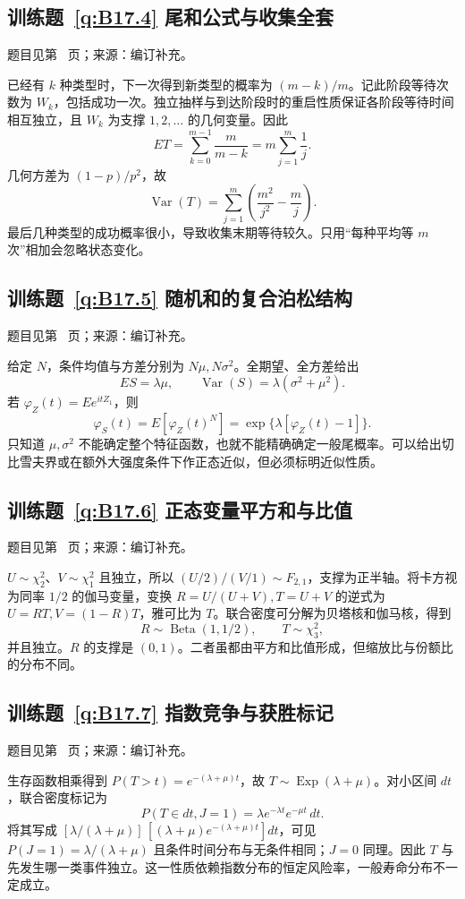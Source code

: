 \documentclass[UTF8,12pt,a4paper,fontset=fandol]{ctexbook}
\begin{document}
\subsection*{训练题~\ref{q:B17.4} 尾和公式与收集全套}\label{a:B17.4}{\small 题目见第~\pageref{q:B17.4} 页；来源：编订补充。}
\begin{solve}已经有 $k$ 种类型时，下一次得到新类型的概率为 $(m-k)/m$。记此阶段等待次数为 $W_k$，包括成功一次。独立抽样与到达阶段时的重启性质保证各阶段等待时间相互独立，且 $W_k$ 为支撑 $1,2,\ldots$ 的几何变量。因此\[ET=\sum_{k=0}^{m-1}\frac{m}{m-k}=m\sum_{j=1}^m\frac1j.\]几何方差为 $(1-p)/p^2$，故\[\operatorname{Var}(T)=\sum_{j=1}^m\left(\frac{m^2}{j^2}-\frac mj\right).\]最后几种类型的成功概率很小，导致收集末期等待较久。只用“每种平均等 $m$ 次”相加会忽略状态变化。\end{solve}

\subsection*{训练题~\ref{q:B17.5} 随机和的复合泊松结构}\label{a:B17.5}{\small 题目见第~\pageref{q:B17.5} 页；来源：编订补充。}
\begin{solve}给定 $N$，条件均值与方差分别为 $N\mu,N\sigma^2$。全期望、全方差给出\[ES=\lambda\mu,\qquad\operatorname{Var}(S)=\lambda(\sigma^2+\mu^2).\]若 $\varphi_Z(t)=Ee^{itZ_1}$，则\[\varphi_S(t)=E[\varphi_Z(t)^N]=\exp\{\lambda[\varphi_Z(t)-1]\}.\]只知道 $\mu,\sigma^2$ 不能确定整个特征函数，也就不能精确确定一般尾概率。可以给出切比雪夫界或在额外大强度条件下作正态近似，但必须标明近似性质。\end{solve}

\subsection*{训练题~\ref{q:B17.6} 正态变量平方和与比值}\label{a:B17.6}{\small 题目见第~\pageref{q:B17.6} 页；来源：编订补充。}
\begin{solve}$U\sim\chi^2_2$、$V\sim\chi^2_1$ 且独立，所以 $(U/2)/(V/1)\sim F_{2,1}$，支撑为正半轴。将卡方视为同率 $1/2$ 的伽马变量，变换 $R=U/(U+V),T=U+V$ 的逆式为 $U=RT,V=(1-R)T$，雅可比为 $T$。联合密度可分解为贝塔核和伽马核，得到\[R\sim\operatorname{Beta}(1,1/2),\qquad T\sim\chi^2_3,\]并且独立。$R$ 的支撑是 $(0,1)$。二者虽都由平方和比值形成，但缩放比与份额比的分布不同。\end{solve}

\subsection*{训练题~\ref{q:B17.7} 指数竞争与获胜标记}\label{a:B17.7}{\small 题目见第~\pageref{q:B17.7} 页；来源：编订补充。}
\begin{solve}生存函数相乘得到 $P(T>t)=e^{-(\lambda+\mu)t}$，故 $T\sim\operatorname{Exp}(\lambda+\mu)$。对小区间 $dt$，联合密度标记为\[P(T\in dt,J=1)=\lambda e^{-\lambda t}e^{-\mu t}\,dt.\]将其写成 $[\lambda/(\lambda+\mu)]\,[(\lambda+\mu)e^{-(\lambda+\mu)t}]dt$，可见 $P(J=1)=\lambda/(\lambda+\mu)$ 且条件时间分布与无条件相同；$J=0$ 同理。因此 $T$ 与先发生哪一类事件独立。这一性质依赖指数分布的恒定风险率，一般寿命分布不一定成立。\end{solve}
\end{document}
